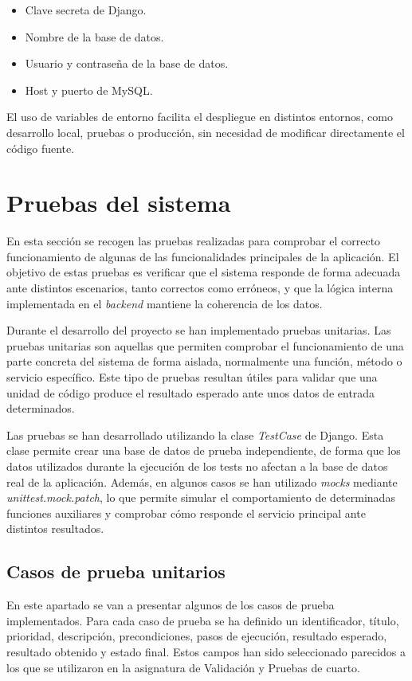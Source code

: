 \begin{itemize}
	\item Clave secreta de Django.
	\item Nombre de la base de datos.
	\item Usuario y contraseña de la base de datos.
	\item Host y puerto de MySQL.
\end{itemize}

El uso de variables de entorno facilita el despliegue en distintos entornos, como desarrollo local, pruebas o producción, sin necesidad de modificar directamente el código fuente.

\section{Pruebas del sistema}

En esta sección se recogen las pruebas realizadas para comprobar el correcto funcionamiento de algunas de las funcionalidades principales de la aplicación. El objetivo de estas pruebas es verificar que el sistema responde de forma adecuada ante distintos escenarios, tanto correctos como erróneos, y que la lógica interna implementada en el \textit{backend} mantiene la coherencia de los datos.

Durante el desarrollo del proyecto se han implementado pruebas unitarias. Las pruebas unitarias son aquellas que permiten comprobar el funcionamiento de una parte concreta del sistema de forma aislada, normalmente una función, método o servicio específico. Este tipo de pruebas resultan útiles para validar que una unidad de código produce el resultado esperado ante unos datos de entrada determinados.

Las pruebas se han desarrollado utilizando la clase \textit{TestCase} de Django. Esta clase permite crear una base de datos de prueba independiente, de forma que los datos utilizados durante la ejecución de los tests no afectan a la base de datos real de la aplicación. Además, en algunos casos se han utilizado \textit{mocks} mediante \textit{unittest.mock.patch}, lo que permite simular el comportamiento de determinadas funciones auxiliares y comprobar cómo responde el servicio principal ante distintos resultados.

\subsection{Casos de prueba unitarios}

En este apartado se van a presentar algunos de los casos de prueba implementados. Para cada caso de prueba se ha definido un identificador, título, prioridad, descripción, precondiciones, pasos de ejecución, resultado esperado, resultado obtenido y estado final. Estos campos han sido seleccionado parecidos a los que se utilizaron en la asignatura de Validación y Pruebas de cuarto.

